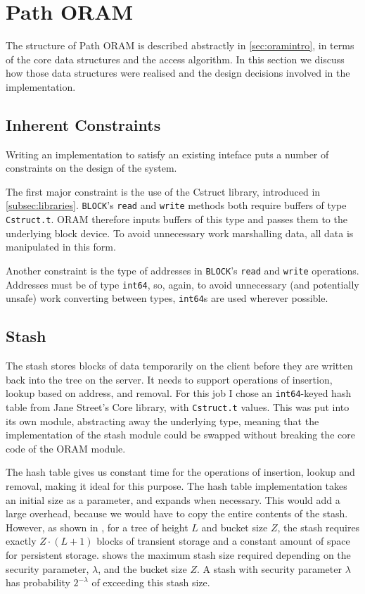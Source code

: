 \documentclass[12pt,a4paper,twoside,openright]{report}
\begin{document}
\section{Path ORAM}
\label{sec:pathORAM}

The structure of Path ORAM is described abstractly in \cref{sec:oramintro}, in terms of the core data structures and the access algorithm. In this section we discuss how those data structures were realised and the design decisions involved in the implementation.

\subsection{Inherent Constraints}
\label{subsec:constraints}

Writing an implementation to satisfy an existing inteface puts a number of constraints on the design of the system.

The first major constraint is the use of the Cstruct library, introduced in \cref{subsec:libraries}. \texttt{BLOCK}'s \texttt{read} and \texttt{write} methods both require buffers of type \texttt{Cstruct.t}. ORAM therefore inputs buffers of this type and passes them to the underlying block device. To avoid unnecessary work marshalling data, all data is manipulated in this form.

Another constraint is the type of addresses in \texttt{BLOCK}'s \texttt{read} and \texttt{write} operations. Addresses must be of type \texttt{int64}, so, again, to avoid unnecessary (and potentially unsafe) work converting between types, \texttt{int64}s are used wherever possible.

\subsection{Stash}
\label{subsec:stashImpl}

The stash stores blocks of data temporarily on the client before they are written back into the tree on the server. It needs to support operations of insertion, lookup based on address, and removal. For this job I chose an \texttt{int64}-keyed hash table from Jane Street's Core library, with \texttt{Cstruct.t} values. This was put into its own module, abstracting away the underlying type, meaning that the implementation of the stash module could be swapped without breaking the core code of the ORAM module.

The hash table gives us constant time for the operations of insertion, lookup and removal, making it ideal for this purpose. The hash table implementation takes an initial size as a parameter, and expands when necessary. This would add a large overhead, because we would have to copy the entire contents of the stash. However, as shown in \citet{stefanov2013path}, for a tree of height $L$ and bucket size $Z$, the stash requires exactly $Z \cdot (L +1)$ blocks of transient storage and a constant amount of space for persistent storage.  shows the maximum stash size required depending on the security parameter, $\lambda$, and the bucket size $Z$. A stash with security parameter $\lambda$ has probability $2^{-\lambda}$ of exceeding this stash size.
\end{document}
